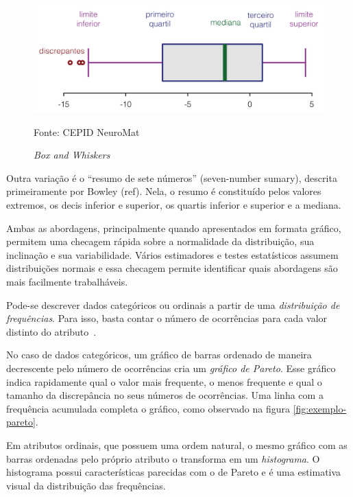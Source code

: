 \documentclass[12pt,a4paper]{article}
\newcommand{\source}[1]{\vspace{-10pt} \caption*{Fonte: {#1}} }
\begin{document}
\begin{figure}[ht]
  \centering
  \includegraphics[scale=0.16]{BoxPlot.png}
  \caption{\textit{Box and Whiskers}}
  \label{fig:descricao-box-and-whiskers}
  \source{CEPID NeuroMat}
\end{figure}

Outra variação é o \enquote{resumo de sete números} (seven-number sumary), descrita primeiramente por Bowley (ref). Nela, o resumo é constituído pelos valores extremos, os decis inferior e superior, os quartis inferior e superior e a mediana.

Ambas as abordagens, principalmente quando apresentados em formata gráfico, permitem uma checagem rápida sobre a normalidade da distribuição, sua inclinação e sua variabilidade. Vários estimadores e testes estatísticos assumem distribuições normais e essa checagem permite identificar quais abordagens são mais facilmente trabalháveis.

Pode-se descrever dados categóricos ou ordinais a partir de uma \textit{distribuição de frequências}. Para isso, basta contar o número de ocorrências para cada valor distinto do atributo~\cite{Nunes2016}.

No caso de dados categóricos, um gráfico de barras ordenado de maneira decrescente pelo número de ocorrências cria um \textit{gráfico de Pareto}. Esse gráfico indica rapidamente qual o valor mais frequente, o menos frequente e qual o tamanho da discrepância no seus números de ocorrências. Uma linha com a frequência acumulada completa o gráfico, como observado na figura \ref{fig:exemplo-pareto}.

Em atributos ordinais, que possuem uma ordem natural, o mesmo gráfico com as barras ordenadas pelo próprio atributo o transforma em um \textit{histograma}. O histograma possui características parecidas com o de Pareto e é uma estimativa visual da distribuição das frequências.
\end{document}
